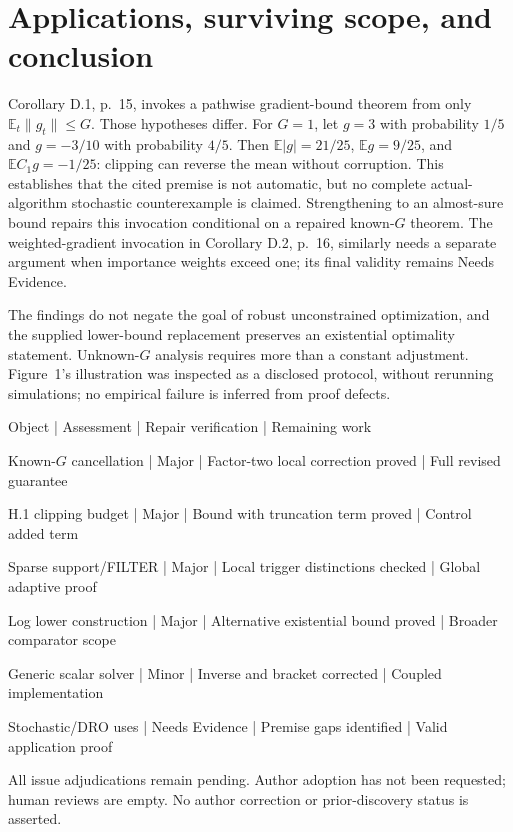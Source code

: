 \documentclass[10pt]{article}
\begin{document}
\section*{Applications, surviving scope, and conclusion}
Corollary D.1, p. 15, invokes a pathwise gradient-bound theorem from only \(\mathbb E_t\|g_t\|\le G\). Those hypotheses differ. For \(G=1\), let \(g=3\) with probability \(1/5\) and \(g=-3/10\) with probability \(4/5\). Then \(\mathbb E|g|=21/25\), \(\mathbb Eg=9/25\), and \(\mathbb EC_1g=-1/25\): clipping can reverse the mean without corruption. This establishes that the cited premise is not automatic, but no complete actual-algorithm stochastic counterexample is claimed. Strengthening to an almost-sure bound repairs this invocation conditional on a repaired known-\(G\) theorem. The weighted-gradient invocation in Corollary D.2, p. 16, similarly needs a separate argument when importance weights exceed one; its final validity remains Needs Evidence.\par
The findings do not negate the goal of robust unconstrained optimization, and the supplied lower-bound replacement preserves an existential optimality statement. Unknown-\(G\) analysis requires more than a constant adjustment. Figure 1’s illustration was inspected as a disclosed protocol, without rerunning simulations; no empirical failure is inferred from proof defects.\par
Object | Assessment | Repair verification | Remaining work\par
Known-\(G\) cancellation | Major | Factor-two local correction proved | Full revised guarantee\par
H.1 clipping budget | Major | Bound with truncation term proved | Control added term\par
Sparse support/FILTER | Major | Local trigger distinctions checked | Global adaptive proof\par
Log lower construction | Major | Alternative existential bound proved | Broader comparator scope\par
Generic scalar solver | Minor | Inverse and bracket corrected | Coupled implementation\par
Stochastic/DRO uses | Needs Evidence | Premise gaps identified | Valid application proof\par
All issue adjudications remain pending. Author adoption has not been requested; human reviews are empty. No author correction or prior-discovery status is asserted.\par
\end{document}
